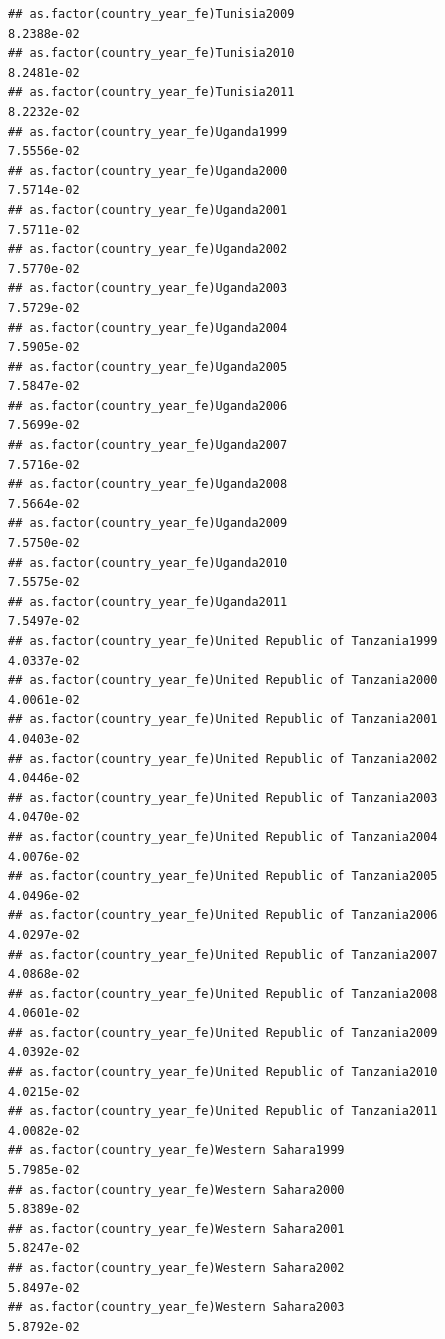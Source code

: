 \documentclass[
  a4paper,
]{article}
\begin{document}
\begin{verbatim}
## as.factor(country_year_fe)Tunisia2009                           8.2388e-02
## as.factor(country_year_fe)Tunisia2010                           8.2481e-02
## as.factor(country_year_fe)Tunisia2011                           8.2232e-02
## as.factor(country_year_fe)Uganda1999                            7.5556e-02
## as.factor(country_year_fe)Uganda2000                            7.5714e-02
## as.factor(country_year_fe)Uganda2001                            7.5711e-02
## as.factor(country_year_fe)Uganda2002                            7.5770e-02
## as.factor(country_year_fe)Uganda2003                            7.5729e-02
## as.factor(country_year_fe)Uganda2004                            7.5905e-02
## as.factor(country_year_fe)Uganda2005                            7.5847e-02
## as.factor(country_year_fe)Uganda2006                            7.5699e-02
## as.factor(country_year_fe)Uganda2007                            7.5716e-02
## as.factor(country_year_fe)Uganda2008                            7.5664e-02
## as.factor(country_year_fe)Uganda2009                            7.5750e-02
## as.factor(country_year_fe)Uganda2010                            7.5575e-02
## as.factor(country_year_fe)Uganda2011                            7.5497e-02
## as.factor(country_year_fe)United Republic of Tanzania1999       4.0337e-02
## as.factor(country_year_fe)United Republic of Tanzania2000       4.0061e-02
## as.factor(country_year_fe)United Republic of Tanzania2001       4.0403e-02
## as.factor(country_year_fe)United Republic of Tanzania2002       4.0446e-02
## as.factor(country_year_fe)United Republic of Tanzania2003       4.0470e-02
## as.factor(country_year_fe)United Republic of Tanzania2004       4.0076e-02
## as.factor(country_year_fe)United Republic of Tanzania2005       4.0496e-02
## as.factor(country_year_fe)United Republic of Tanzania2006       4.0297e-02
## as.factor(country_year_fe)United Republic of Tanzania2007       4.0868e-02
## as.factor(country_year_fe)United Republic of Tanzania2008       4.0601e-02
## as.factor(country_year_fe)United Republic of Tanzania2009       4.0392e-02
## as.factor(country_year_fe)United Republic of Tanzania2010       4.0215e-02
## as.factor(country_year_fe)United Republic of Tanzania2011       4.0082e-02
## as.factor(country_year_fe)Western Sahara1999                    5.7985e-02
## as.factor(country_year_fe)Western Sahara2000                    5.8389e-02
## as.factor(country_year_fe)Western Sahara2001                    5.8247e-02
## as.factor(country_year_fe)Western Sahara2002                    5.8497e-02
## as.factor(country_year_fe)Western Sahara2003                    5.8792e-02

\end{verbatim}
\end{document}
